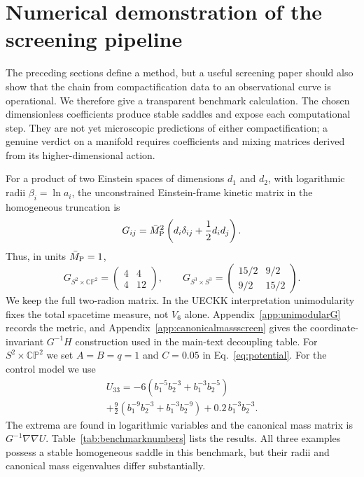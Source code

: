 \documentclass[11pt,a4paper]{article}
\newcommand{\Mpl}{\bar M_{\rm P}}
\newcommand{\CP}{\mathbb{CP}}
\begin{document}
\section{Numerical demonstration of the screening pipeline}
\label{sec:numericaldemo}
The preceding sections define a method, but a useful screening paper should also show that the chain from compactification data to an observational curve is operational. We therefore give a transparent benchmark calculation. The chosen dimensionless coefficients produce stable saddles and expose each computational step. They are not yet microscopic predictions of either compactification; a genuine verdict on a manifold requires coefficients and mixing matrices derived from its higher-dimensional action.

For a product of two Einstein spaces of dimensions $d_1$ and $d_2$, with logarithmic radii $\beta_i=\ln a_i$, the unconstrained Einstein-frame kinetic matrix in the homogeneous truncation is
\begin{equation}
G_{ij}=\Mpl^2\left(d_i\delta_{ij}+\frac12 d_i d_j\right).
\label{eq:kineticmatrixbenchmark}
\end{equation}
Thus, in units $\Mpl=1$,
\begin{equation}
G_{S^2\times\CP^2}=\begin{pmatrix}4&4\\4&12\end{pmatrix},\qquad
G_{S^3\times S^3}=\begin{pmatrix}15/2&9/2\\9/2&15/2\end{pmatrix}.
\end{equation}
We keep the full two-radion matrix. In the UECKK interpretation unimodularity fixes the total spacetime measure, not $V_6$ alone. Appendix~\ref{app:unimodularG} records the metric, and Appendix~\ref{app:canonicalmassscreen} gives the coordinate-invariant $G^{-1}H$ construction used in the main-text decoupling table.
For $S^2\times\CP^2$ we set $A=B=q=1$ and $C=0.05$ in Eq.~\eqref{eq:potential}. For the control model we use
\begin{multline}
U_{33}=-6\left(b_1^{-5}b_2^{-3}+b_1^{-3}b_2^{-5}\right)\\
+\frac92\left(b_1^{-9}b_2^{-3}+b_1^{-3}b_2^{-9}\right)
+0.2\,b_1^{-3}b_2^{-3}.
\label{eq:s3benchmarkpotential}
\end{multline}
The extrema are found in logarithmic variables and the canonical mass matrix is $G^{-1}\nabla\nabla U$. Table~\ref{tab:benchmarknumbers} lists the results. All three examples possess a stable homogeneous saddle in this benchmark, but their radii and canonical mass eigenvalues differ substantially.
\end{document}
